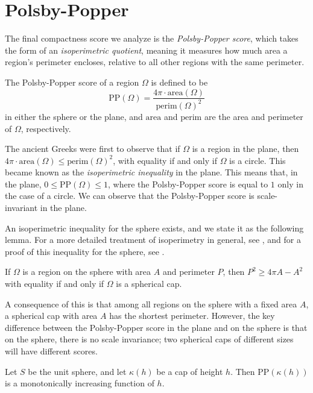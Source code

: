 \section{Polsby-Popper}\label{sec:pp}
The final compactness score we analyze is the \textit{Polsby-Popper
score}, which takes the form of an \textit{isoperimetric quotient},
meaning it measures how much area a region's perimeter encloses,
relative to all other regions with the same perimeter.

\begin{definition}\label{def:pp}
  The Polsby-Popper score of a region $\Omega$ is defined to be
  $$\mathrm{PP}(\Omega) = \frac{4\pi
  \cdot\mathrm{area}(\Omega)}{\mathrm{perim}(\Omega)^2}$$ 
in either the sphere or the plane, and
  $\mathrm{area}$ and $\mathrm{perim}$ are the area and perimeter of
    $\Omega$, respectively.
\end{definition}

The ancient Greeks were first to observe that if $\Omega$ is a region
in the plane, then $4\pi\cdot\mathrm{area}(\Omega)\leq
\mathrm{perim}(\Omega)^2$, with equality if and only if $\Omega$ is
a circle. This became known as the \textit{isoperimetric inequality} in
the plane.  This means that, in the plane, $0\le \mathrm{PP}(\Omega)\le 1$,
where the Polsby-Popper score is equal to $1$ only in the case of
a circle. We can observe that the Polsby-Popper score is scale-invariant in
the plane. 

An isoperimetric inequality for the sphere exists, and we
state it as the following lemma.  For a more detailed treatment of
isoperimetry in general, see \cite{osserman1979bonnesen}, and for
a proof of this inequality for the sphere, see \cite{rado}.

\begin{lemma}
  If $\Omega$ is a region on the sphere with area
  $A$ and perimeter $P$, then $P^2\geq 4\pi A - A^2$ with equality if
  and only if $\Omega$ is a spherical cap.
\end{lemma}
A consequence of this is that among all regions on the sphere with
a fixed area $A$, a spherical cap with area $A$ has the shortest
perimeter. However, the key difference between the Polsby-Popper score in the plane and on the sphere is that on the 
sphere, there is no scale invariance; two spherical caps of different sizes will have different scores.


\begin{lemma}\label{lem:ppscale}
  Let $S$ be the unit sphere, and let $\kappa(h)$ be a cap of height
  $h$.  Then $\mathrm{PP}(\kappa(h))$ is
  a monotonically increasing function of $h$.
\end{lemma}


